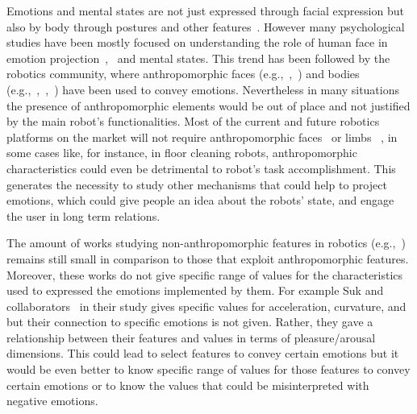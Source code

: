 Emotions and mental states are not just expressed through facial expression but also by body through postures and other features~\cite{Gelder2008}. However  many psychological studies have been mostly focused on understanding the role of human face in emotion projection~\cite{Ekman2004},~\cite{kleinsmith2012affective} and mental states. This trend has been followed by the robotics community, where anthropomorphic faces (e.g.,~\cite{Arras2012},~\cite{Breazeal2002}) and bodies (e.g.,~\cite{Canamero2010},~\cite{haering2011},~\cite{Destephe2013}) have been used to convey emotions.
Nevertheless in many situations the presence of anthropomorphic elements would be out of place and not justified by the main robot's functionalities. Most of the current and future robotics platforms on the market will not require anthropomorphic faces~\cite{Breazeal2002} or limbs~\cite{Li2011} , in some cases like, for instance, in floor cleaning robots, anthropomorphic characteristics could even be detrimental to robot's task accomplishment.
This generates the necessity to study other mechanisms that could help to project emotions, which could give people an idea about the robots' state, and engage the user in long term relations.

The amount of works studying non-anthropomorphic features in robotics (e.g.,~\cite{Saerbeck2010,Lakatos2014,Sharma2013,Novika2015}) remains still small in comparison to those that exploit anthropomorphic features. Moreover, these works do not give specific range of values for the characteristics used to expressed the emotions implemented by them. For example Suk and collaborators~\cite{NAM2014} in their study gives specific values for acceleration, curvature, and but their connection to specific emotions is not given. Rather, they gave a relationship between their features and values in terms of pleasure/arousal dimensions. This could lead to select features to convey certain emotions but it would be even better to know specific range of values for those features to convey certain emotions or to know the values that could be misinterpreted with negative emotions.
 

